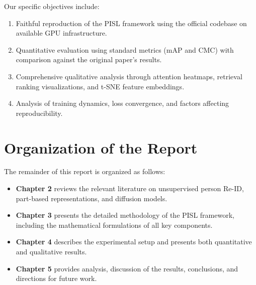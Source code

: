 Our specific objectives include:
\begin{enumerate}
    \item Faithful reproduction of the PISL framework using the official codebase on available GPU infrastructure.
    \item Quantitative evaluation using standard metrics (mAP and CMC) with comparison against the original paper's results.
    \item Comprehensive qualitative analysis through attention heatmaps, retrieval ranking visualizations, and t-SNE feature embeddings.
    \item Analysis of training dynamics, loss convergence, and factors affecting reproducibility.
\end{enumerate}

\section{Organization of the Report}

The remainder of this report is organized as follows:
\begin{itemize}
    \item \textbf{Chapter 2} reviews the relevant literature on unsupervised person Re-ID, part-based representations, and diffusion models.
    \item \textbf{Chapter 3} presents the detailed methodology of the PISL framework, including the mathematical formulations of all key components.
    \item \textbf{Chapter 4} describes the experimental setup and presents both quantitative and qualitative results.
    \item \textbf{Chapter 5} provides analysis, discussion of the results, conclusions, and directions for future work.
\end{itemize}
